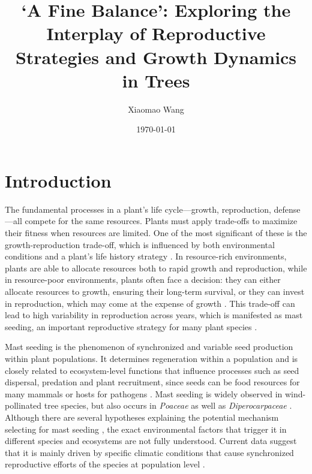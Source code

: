 \documentclass[11pt,letter]{article}
\begin{document}
\title{`A Fine Balance': Exploring the Interplay of Reproductive Strategies and Growth Dynamics in Trees}
\author{Xiaomao Wang} 
\date{\today}
\maketitle


\section{Introduction} 
The fundamental processes in a plant's life cycle—growth, reproduction, defense—all compete for the same resources. Plants must apply trade-offs to maximize their fitness when resources are limited. One of the most significant of these is the growth-reproduction trade-off, which is influenced by both environmental conditions and a plant's life history strategy \citep{grime1977evidence, stearns1998evolution}. In resource-rich environments, plants are able to allocate resources both to rapid growth and reproduction, while in resource-poor environments, plants often face a decision: they can either allocate resources to growth, ensuring their long-term survival, or they can invest in reproduction, which may come at the expense of growth \citep{bazzaz1997allocation}. This trade-off can lead to high variability in reproduction across years, which is manifested as mast seeding, an important reproductive strategy for many plant species \citep{pearse2016mechanisms}.

Mast seeding is the phenomenon of synchronized and variable seed production within plant populations. It determines regeneration within a population and is closely related to ecosystem-level functions that influence processes such as seed dispersal, predation and plant recruitment, since seeds can be food resources for many mammals or hosts for pathogens  \citep{davies2024seed, janzen1971seed, kelly1994evolutionary}. Mast seeding is widely observed in wind-pollinated tree species, but also occurs in \textit{Poaceae} as well as \textit{Diperocarpaceae} \citep{kelly2002mast}. Although there are several hypotheses explaining the potential mechanism selecting for mast seeding  \citep[e.g., predator satiation, resource matching, etc., discussed more in Chapter 2,][]{koenig2021brief}, the exact environmental factors that trigger it in different species and ecosystems are not fully understood. Current data suggest that it is mainly driven by specific climatic conditions that cause synchronized reproductive efforts of the species at population level  \citep{pearse2016mechanisms}.
\end{document}
